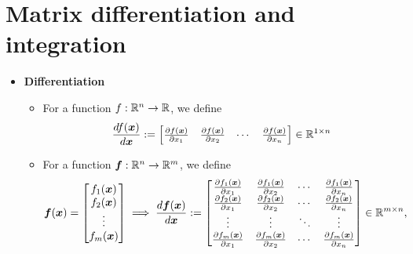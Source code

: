 \documentclass[12pt,a4paper]{article}
\begin{document}
\section{Matrix differentiation and integration}

\begin{itemize}

\item \textbf{Differentiation}
  \begin{itemize}
  \item For a function $f:\mathbb{R}^{n}\to \mathbb{R}$, we define
    \begin{equation}\nonumber%
      \frac{df(\bm{x})}{d\bm{x}} :=
      \begin{bmatrix}
        \frac{\partial f(\bm{x})}{\partial x_{1}}
        & \frac{\partial f(\bm{x})}{\partial x_{2}}
        & \cdots
        & \frac{\partial f(\bm{x})}{\partial x_{n}}
      \end{bmatrix}\in \R^{1\times n}
    \end{equation}
  \item For a function $\bm{f}:\mathbb{R}^{n}\to \mathbb{R}^{m}$, we define
    \begin{equation}\nonumber%
      \bm{f}(\bm{x})
      =
      \begin{bmatrix}
        f_{1}(\bm{x}) \\
        f_{2}(\bm{x}) \\
        \vdots \\
        f_{m}(\bm{x}) \\
      \end{bmatrix}
      \implies
      \frac{d\bm{f}(\bm{x})}{d\bm{x}} :=
      \begin{bmatrix}
        \frac{\partial f_{1}(\bm{x})}{\partial x_{1}}
        & \frac{\partial f_{1}(\bm{x})}{\partial x_{2}}
        & \cdots 
        & \frac{\partial f_{1}(\bm{x})}{\partial x_{n}} \\
        \frac{\partial f_{2}(\bm{x})}{\partial x_{1}}
        & \frac{\partial f_{2}(\bm{x})}{\partial x_{2}}
        & \cdots 
        & \frac{\partial f_{2}(\bm{x})}{\partial x_{n}} \\
        \vdots & \vdots & \ddots & \vdots \\
        \frac{\partial f_{m}(\bm{x})}{\partial x_{1}}
        & \frac{\partial f_{m}(\bm{x})}{\partial x_{2}}
        & \cdots 
        & \frac{\partial f_{m}(\bm{x})}{\partial x_{n}} \\
      \end{bmatrix}
      \in \R^{m\times n},

\end{equation}
\end{itemize}
\end{itemize}
\end{document}
